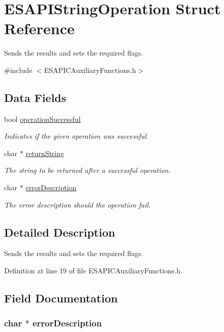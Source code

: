 \hypertarget{a00002}{
\section{ESAPIStringOperation Struct Reference}
\label{d7/d46/a00002}
}


Sends the results and sets the required flags.  




{\ttfamily \#include $<$ESAPICAuxiliaryFunctions.h$>$}

\subsection*{Data Fields}
\begin{DoxyCompactItemize}
\item 
bool \hyperlink{a00002_a60d5c2a9f6ce8f351a24f7c3d816de5c}{operationSuccessful}
\begin{DoxyCompactList}\small\item\em Indicates if the given operation was successful. \end{DoxyCompactList}\item 
char $\ast$ \hyperlink{a00002_ae335833c00b0feebd0ba7610cb1863a8}{returnString}
\begin{DoxyCompactList}\small\item\em The string to be returned after a successful operation. \end{DoxyCompactList}\item 
char $\ast$ \hyperlink{a00002_a7b2f8d3eac842c2b166bd94c5e59deed}{errorDescription}
\begin{DoxyCompactList}\small\item\em The error description should the operation fail. \end{DoxyCompactList}\end{DoxyCompactItemize}


\subsection{Detailed Description}
Sends the results and sets the required flags. 

Definition at line 19 of file ESAPICAuxiliaryFunctions.h.



\subsection{Field Documentation}
\hypertarget{a00002_a7b2f8d3eac842c2b166bd94c5e59deed}{
\subsubsection[{errorDescription}]{\setlength{\rightskip}{0pt plus 5cm}char $\ast$ {\bf errorDescription}}}
\label{d7/d46/a00002_a7b2f8d3eac842c2b166bd94c5e59deed}


